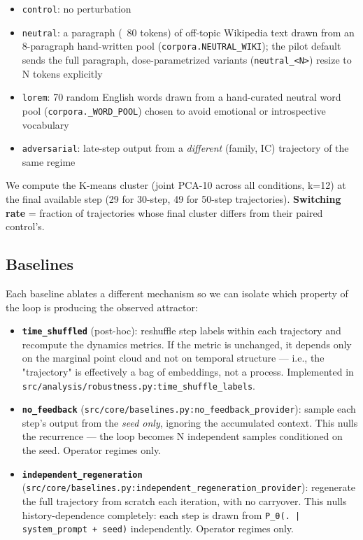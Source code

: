 \documentclass{article}
\theoremstyle{plain}
\theoremstyle{definition}
\begin{document}
\begin{itemize}
  \item \texttt{control}: no perturbation
  \item \texttt{neutral}: a paragraph (~80 tokens) of off-topic Wikipedia text drawn
  from an 8-paragraph hand-written pool (\texttt{corpora.NEUTRAL\_WIKI}); the
  pilot default sends the full paragraph, dose-parametrized variants
  (\texttt{neutral\_<N>}) resize to N tokens explicitly
  \item \texttt{lorem}: 70 random English words drawn from a hand-curated neutral
  word pool (\texttt{corpora.\_WORD\_POOL}) chosen to avoid emotional or
  introspective vocabulary
  \item \texttt{adversarial}: late-step output from a \textit{different} (family, IC) trajectory of the same regime
\end{itemize}

We compute the K-means cluster (joint PCA-10 across all conditions, k=12)
at the final available step (29 for 30-step, 49 for 50-step trajectories).
\textbf{Switching rate} = fraction of trajectories whose final cluster differs
from their paired control's.

\subsection{Baselines}

Each baseline ablates a different mechanism so we can isolate which
property of the loop is producing the observed attractor:

\begin{itemize}
  \item \textbf{\texttt{time\_shuffled}} (post-hoc): reshuffle step labels within each
  trajectory and recompute the dynamics metrics. If the metric is
  unchanged, it depends only on the marginal point cloud and not on
  temporal structure — i.e., the "trajectory" is effectively a bag of
  embeddings, not a process. Implemented in
  \texttt{src/analysis/robustness.py:time\_shuffle\_labels}.
  \item \textbf{\texttt{no\_feedback}} (\texttt{src/core/baselines.py:no\_feedback\_provider}):
  sample each step's output from the \textit{seed only}, ignoring the
  accumulated context. This nulls the recurrence — the loop becomes N
  independent samples conditioned on the seed. Operator regimes only.
  \item \textbf{\texttt{independent\_regeneration}}
  (\texttt{src/core/baselines.py:independent\_regeneration\_provider}):
  regenerate the full trajectory from scratch each iteration, with no
  carryover. This nulls history-dependence completely: each step is
  drawn from \texttt{P\_θ(. | system\_prompt + seed)} independently. Operator
  regimes only.
\end{itemize}
\end{document}
